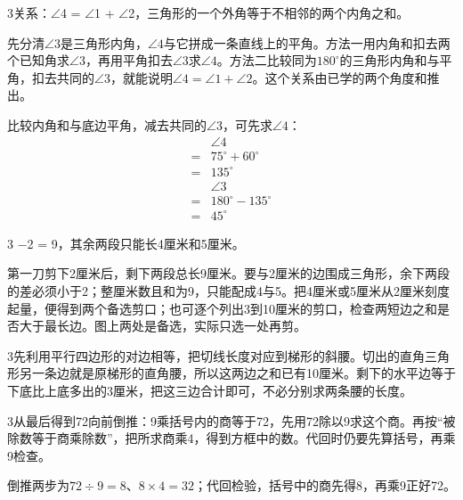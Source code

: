 \documentclass[multi=snippet,border={5bp 20bp 5bp 5bp}]{standalone}
\newenvironment{snippet}[3]{\begin{minipage}{#1bp}\color{answerred}\fontsize{#2}{#3}\selectfont\raggedright}{\end{minipage}}
\begin{document}
\begin{snippet}{505}{11.5}{14}\begin{multicols}{3}\raggedcolumns 关系：\ensuremath{\angle}4 = \ensuremath{\angle}1 + \ensuremath{\angle}2，三角形的一个外角等于不相邻的两个内角之和。\par 先分清\(\angle3\)\allowbreak 是三角形内角，\(\angle4\)\allowbreak 与它拼成一条直线上的平角。方法一用内角和扣去两个已知角求\(\angle3\)\allowbreak ，再用平角扣去\(\angle3\)\allowbreak 求\(\angle4\)\allowbreak 。方法二比较同为\(180^\circ\)\allowbreak 的三角形内角和与平角，扣去共同的\(\angle3\)\allowbreak ，就能说明\(\angle4=\angle1+\angle2\)\allowbreak 。这个关系由已学的两个角度和推出。\par 比较内角和与底边平角，减去共同的\(\angle3\)\allowbreak ，可先求\(\angle4\)\allowbreak ：\[\begin{aligned}&\angle4\\={}&75^\circ+60^\circ\\={}&135^\circ\\&\angle3\\={}&180^\circ-135^\circ\\={}&45^\circ\end{aligned}\]\end{multicols}\end{snippet}
\begin{snippet}{505}{11.5}{14}\begin{multicols}{3} \ensuremath{-}2 = 9，其余两段只能长4厘米和5厘米。\par 第一刀剪下2厘米后，剩下两段总长9厘米。要与2厘米的边围成三角形，余下两段的差必须小于2；整厘米数且和为9，只能配成4与5。把4厘米或5厘米从2厘米刻度起量，便得到两个备选剪口；也可逐个列出3到10厘米的剪口，检查两短边之和是否大于最长边。图上两处是备选，实际只选一处再剪。\end{multicols}\end{snippet}
\begin{snippet}{505}{11.5}{14}\begin{multicols}{3}\raggedcolumns 先利用平行四边形的对边相等，把切线长度对应到梯形的斜腰。切出的直角三角形另一条边就是原梯形的直角腰，所以这两边之和已有10厘米。剩下的水平边等于下底比上底多出的3厘米，把这三边合计即可，不必分别求两条腰的长度。\end{multicols}\end{snippet}
\begin{snippet}{505}{11.5}{14}\begin{multicols}{3}\raggedcolumns 从最后得到72向前倒推：9乘括号内的商等于72，先用72除以9求这个商。再按“被除数等于商乘除数”，把所求商乘4，得到方框中的数。代回时仍要先算括号，再乘9检查。\par 倒推两步为\(72\div9=8\)\allowbreak 、\(8\times4=32\)\allowbreak ；代回检验，括号中的商先得8，再乘9正好72。\end{multicols}\end{snippet}
\end{document}
